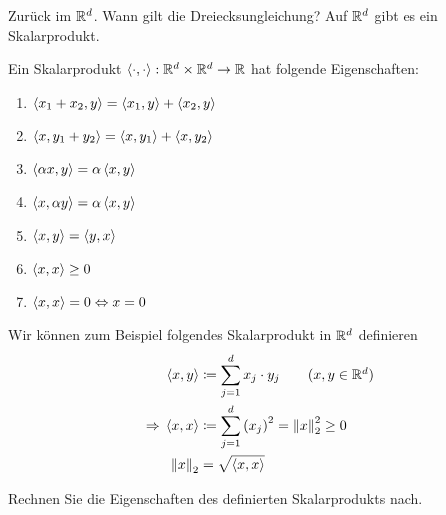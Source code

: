 Zurück im $\mathbb{R}^d$. Wann gilt die Dreiecksungleichung? Auf $\mathbb{R}^d$ gibt es ein Skalarprodukt.

\begin{definition}[Skalarprodukt]
    Ein Skalarprodukt $\left<\cdot, \cdot\right>: \mathbb{R}^d \times \mathbb{R}^d \rightarrow{} \mathbb{R}$ hat folgende Eigenschaften:
    \begin{enumerate}[label=(\roman*)]
        \item $\left<x_1+x_2,y\right> = \left<x_1,y\right> + \left<x_2,y\right>$
        \item $\left<x,y_1+y_2\right> = \left<x,y_1\right> + \left<x,y_2\right>$
        \item $\left<\alpha x,y\right> = \alpha \left<x,y\right>$
        \item $\left<x,\alpha y\right> = \alpha \left<x,y\right>$
        \item $\left<x,y\right> = \left<y,x\right>$
        \item $\left<x,x\right> \geq 0$
        \item $\left<x,x\right> = 0 \Leftrightarrow{} x = 0$
    \end{enumerate}
\end{definition}

\begin{beispiel}
    Wir können zum Beispiel folgendes Skalarprodukt in $\mathbb{R}^d$ definieren
    \begin{align*}
        \sprod{x,y} &\definedas \sum_{j=1}^{d} x_j\cdot y_j\tag{$x,y\in\R^d$}\\
        \impl \sprod{x,x} &\definedas \sum_{j=1}^{d} \pair{x_j}^2 = \norm{x}^2_2 \geq 0\\
        \norm{x}_2 &= \sqrt {\sprod{x,x}}
    \end{align*}
\end{beispiel}

\begin{uebung}
    Rechnen Sie die Eigenschaften des definierten Skalarprodukts nach.
\end{uebung}

